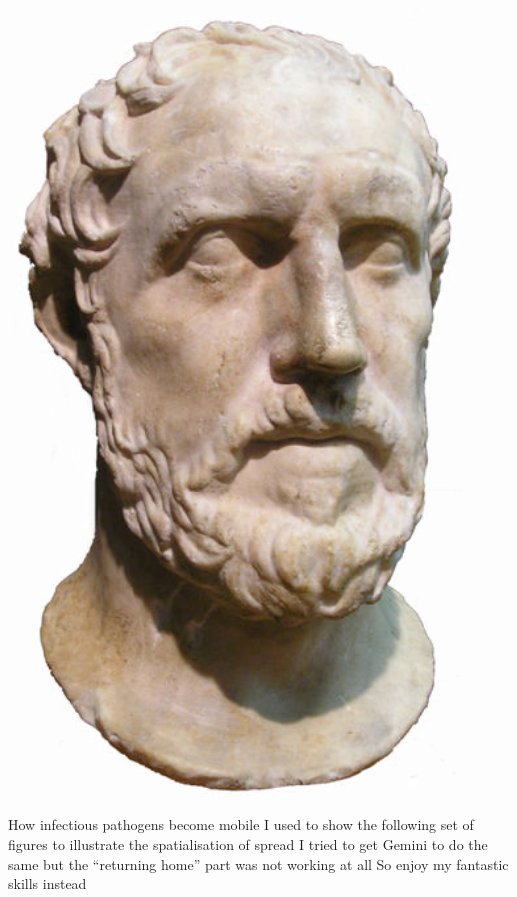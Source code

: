 \documentclass[aspectratio=169]{beamer}\usepackage[]{graphicx}\usepackage[]{xcolor}
\begin{document}
{\begin{minipage}{0.25\textwidth}
\begin{center}
\includegraphics[width=0.9\textwidth]{FIGS/Thucydides-bust-noBG}
\end{center}
\end{minipage}
}

\begin{frame}{How infectious pathogens become mobile}
\bbullet
I used to show the following set of figures to illustrate the spatialisation of spread
\vfill
\bbullet
I tried to get Gemini to do the same but the ``returning home'' part was not working at all
\vfill
\bbullet
So enjoy my fantastic skills instead
\end{frame}

\end{document}
